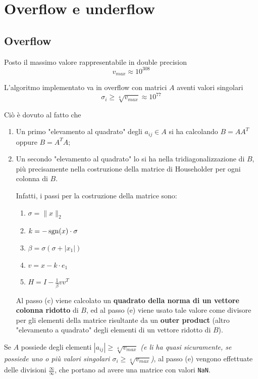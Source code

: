 \newpage
\section{Overflow e underflow}
\subsection{Overflow}
Posto il massimo valore rappresentabile in double precision
\begin{equation*}
	v_{max} \approx 10^{308}
\end{equation*}

L'algoritmo implementato va in overflow con matrici $A$ aventi valori singolari
\begin{equation*}
	\sigma_i \geq \sqrt[4]{v_{max}} \approx 10^{77}
\end{equation*}

Ciò è dovuto al fatto che
\begin{enumerate}
	\item Un primo "elevamento al quadrato" degli $a_{ij} \in A$ si ha calcolando 
$B = A A^T$ oppure $B = A^T A$;
	\item Un secondo "elevamento al quadrato" lo si ha nella tridiagonalizzazione 
di $B$, più precisamente nella costruzione della matrice di Householder per ogni 
colonna di $B$.
	
	Infatti, i passi per la costruzione della matrice sono:
	\begin{enumerate}
		\item $\sigma = \| x \|_2$
		\item $k = -\operatorname{sgn}(x) \cdot \sigma$
		\item $\beta = \sigma (\sigma + | x_1 |)$
		\item $v = x - k \cdot e_1$
		\item $H = I - \frac{1}{\beta}v v^T $
	\end{enumerate}
	
Al passo (c) viene calcolato un \textbf{quadrato della norma di un vettore 
colonna ridotto} di $B$, ed al passo (e) viene usato tale valore come divisore 
per gli elementi della matrice risultante da un \textbf{outer product} (altro 
"elevamento a quadrato" degli elementi di un vettore ridotto di $B$).


\end{enumerate}

Se $A$ possiede degli elementi $|a_{ij}| \geq \sqrt[4]{v_{max}}$ \textit{(e li 
ha quasi sicuramente, se possiede uno o più valori singolari $\sigma_i \geq 
\sqrt[4]{v_{max}}$)}, al passo (e) vengono effettuate delle divisioni 
$\frac{\infty}{\infty}$, che portano ad avere una matrice con valori 
\texttt{NaN}.



